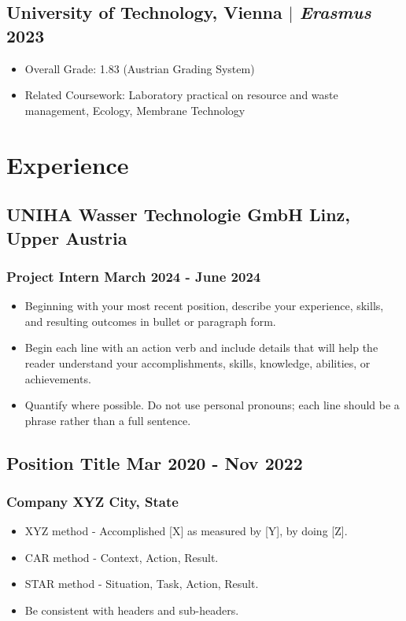 \documentclass[11pt]{article} %
\begin{document}
\subsection{University of Technology, Vienna $|$ {\normalfont\itshape Erasmus} \hfill 2023}
\begin{itemize}
	\item Overall Grade: 1.83 (Austrian Grading System)
  \item Related Coursework: Laboratory practical on resource and waste management, Ecology, Membrane Technology
\end{itemize}

\section{Experience}
\subsection{UNIHA Wasser Technologie GmbH \hfill Linz, Upper Austria}
\subsubsection{Project Intern \hfill  March 2024 - June 2024}
\begin{itemize}
	\item Beginning with your most recent position, describe your experience, skills, and resulting outcomes in bullet or paragraph form.
	\item Begin each line with an action verb and include details that will help the reader understand your accomplishments, skills, knowledge, abilities, or achievements.
	\item Quantify where possible. Do not use personal pronouns; each line should be a phrase rather than a full sentence.
\end{itemize}

\subsection{Position Title \hfill Mar 2020 - Nov 2022}
\subsubsection{Company XYZ \hfill City, State}
\begin{itemize}
	\item XYZ method - Accomplished [X] as measured by [Y], by doing [Z].
	\item CAR method - Context, Action, Result. 
	\item STAR method - Situation, Task, Action, Result.
	\item Be consistent with headers and sub-headers. 
\end{itemize}
\end{document}
